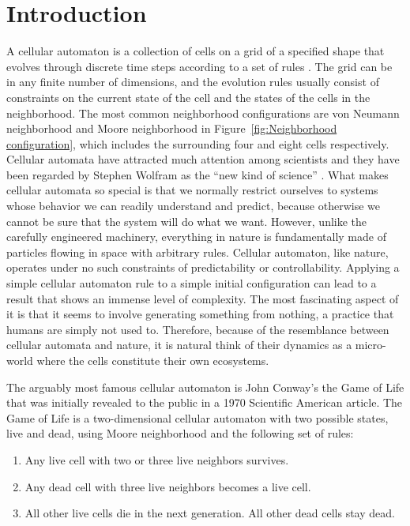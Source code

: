 \documentclass[12pt]{article}
\numberwithin{figure}{section} %
\begin{document}
\section{Introduction}
A cellular automaton is a collection of cells on a grid of a specified shape that evolves through discrete time steps according to a set of rules \cite{Cellular automaton}. The grid can be in any finite number of dimensions, and the evolution rules usually consist of constraints on the current state of the cell and the states of the cells in the neighborhood. The most common neighborhood configurations are von Neumann neighborhood and Moore neighborhood in Figure~\ref{fig:Neighborhood configuration}, which includes the surrounding four and eight cells respectively. Cellular automata have attracted much attention among scientists and they have been regarded by Stephen Wolfram as the “new kind of science” \cite{A new kind of Science}. What makes cellular automata so special is that we normally restrict ourselves to systems whose behavior we can readily understand and predict, because otherwise we cannot be sure that the system will do what we want. However, unlike the carefully engineered machinery, everything in nature is fundamentally made of particles flowing in space with arbitrary rules. Cellular automaton, like nature, operates under no such constraints of predictability or controllability. Applying a simple cellular automaton rule to a simple initial configuration can lead to a result that shows an immense level of complexity. The most fascinating aspect of it is that it seems to involve generating something from nothing, a practice that humans are simply not used to. Therefore, because of the resemblance between cellular automata and nature, it is natural think of their dynamics as a micro-world where the cells constitute their own ecosystems. 

The arguably most famous cellular automaton is John Conway’s the Game of Life \cite{The Game of Life} that was initially revealed to the public in a 1970 Scientific American article. The Game of Life is a two-dimensional cellular automaton with two possible states, live and dead, using Moore neighborhood and the following set of rules: 
\begin{enumerate}[topsep=0pt,itemsep=-1ex,partopsep=1ex,parsep=1ex]
\item Any live cell with two or three live neighbors survives. 
\item Any dead cell with three live neighbors becomes a live cell. 
\item All other live cells die in the next generation. All other dead cells stay dead. 
\end{enumerate}
\end{document}
